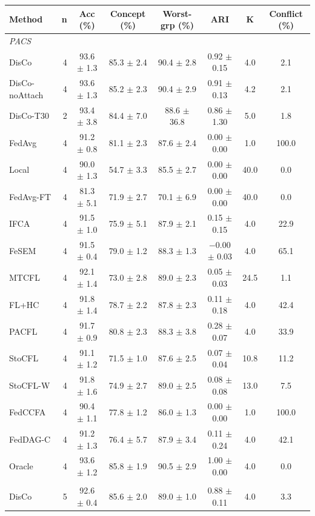 {\scriptsize
\begin{tabular}{l r c c c c c c}
\toprule
Method & n & Acc (\%) & Concept (\%) & Worst-grp (\%) & ARI & K & Conflict (\%) \\
\midrule
\multicolumn{8}{l}{\textit{PACS}} \\
DisCo & 4 & 93.6 $\pm$ 1.3 & 85.3 $\pm$ 2.4 & 90.4 $\pm$ 2.8 & 0.92 $\pm$ 0.15 & 4.0 & 2.1 \\
DisCo-noAttach & 4 & 93.6 $\pm$ 1.3 & 85.2 $\pm$ 2.3 & 90.4 $\pm$ 2.9 & 0.91 $\pm$ 0.13 & 4.2 & 2.1 \\
DisCo-T30 & 2 & 93.4 $\pm$ 3.8 & 84.4 $\pm$ 7.0 & 88.6 $\pm$ 36.8 & 0.86 $\pm$ 1.30 & 5.0 & 1.8 \\
FedAvg & 4 & 91.2 $\pm$ 0.8 & 81.1 $\pm$ 2.3 & 87.6 $\pm$ 2.4 & 0.00 $\pm$ 0.00 & 1.0 & 100.0 \\
Local & 4 & 90.0 $\pm$ 1.3 & 54.7 $\pm$ 3.3 & 85.5 $\pm$ 2.7 & 0.00 $\pm$ 0.00 & 40.0 & 0.0 \\
FedAvg-FT & 4 & 81.3 $\pm$ 5.1 & 71.9 $\pm$ 2.7 & 70.1 $\pm$ 6.9 & 0.00 $\pm$ 0.00 & 40.0 & 0.0 \\
IFCA & 4 & 91.5 $\pm$ 1.0 & 75.9 $\pm$ 5.1 & 87.9 $\pm$ 2.1 & 0.15 $\pm$ 0.15 & 4.0 & 22.9 \\
FeSEM & 4 & 91.5 $\pm$ 0.4 & 79.0 $\pm$ 1.2 & 88.3 $\pm$ 1.3 & $-$0.00 $\pm$ 0.03 & 4.0 & 65.1 \\
MTCFL & 4 & 92.1 $\pm$ 1.4 & 73.0 $\pm$ 2.8 & 89.0 $\pm$ 2.3 & 0.05 $\pm$ 0.03 & 24.5 & 1.1 \\
FL+HC & 4 & 91.8 $\pm$ 1.4 & 78.7 $\pm$ 2.2 & 87.8 $\pm$ 2.3 & 0.11 $\pm$ 0.18 & 4.0 & 42.4 \\
PACFL & 4 & 91.7 $\pm$ 0.9 & 80.8 $\pm$ 2.3 & 88.3 $\pm$ 3.8 & 0.28 $\pm$ 0.07 & 4.0 & 33.9 \\
StoCFL & 4 & 91.1 $\pm$ 1.2 & 71.5 $\pm$ 1.0 & 87.6 $\pm$ 2.5 & 0.07 $\pm$ 0.04 & 10.8 & 11.2 \\
StoCFL-W & 4 & 91.8 $\pm$ 1.6 & 74.9 $\pm$ 2.7 & 89.0 $\pm$ 2.5 & 0.08 $\pm$ 0.08 & 13.0 & 7.5 \\
FedCCFA & 4 & 90.4 $\pm$ 1.1 & 77.8 $\pm$ 1.2 & 86.0 $\pm$ 1.3 & 0.00 $\pm$ 0.00 & 1.0 & 100.0 \\
FedDAG-C & 4 & 91.2 $\pm$ 1.3 & 76.4 $\pm$ 5.7 & 87.9 $\pm$ 3.4 & 0.11 $\pm$ 0.24 & 4.0 & 42.1 \\
Oracle & 4 & 93.6 $\pm$ 1.2 & 85.8 $\pm$ 1.9 & 90.5 $\pm$ 2.9 & 1.00 $\pm$ 0.00 & 4.0 & 0.0 \\
\addlinespace
\multicolumn{8}{l}{\textit{PACS + QS}} \\
DisCo & 5 & 92.6 $\pm$ 0.4 & 85.6 $\pm$ 2.0 & 89.0 $\pm$ 1.0 & 0.88 $\pm$ 0.11 & 4.0 & 3.3 \\

\end{tabular}}
